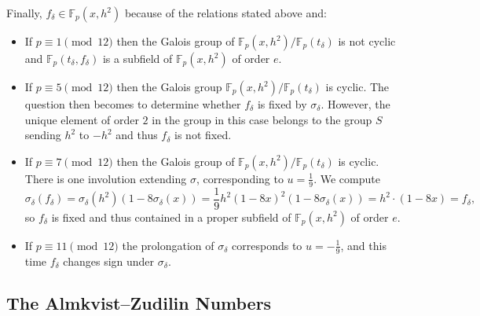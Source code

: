 \documentclass{article}
\newcommand{\F}{\mathbb{F}}
\theoremstyle{definition}
\theoremstyle{plain}
\theoremstyle{remark}
\begin{document}
Finally, $f_\delta \in \F_p(x, h^2)$ because of the relations stated above and:
\begin{itemize}
    \item If $p\equiv 1\pmod{12}$ then the Galois group of $\F_p(x, h^2)/\F_p(t_\delta)$ is not cyclic and $\F_p(t_\delta, f_\delta)$ is a subfield of $\F_p(x, h^2)$ of order $e$.
    \item If $p\equiv 5\pmod{12}$ then the Galois group $\F_p(x, h^2)/\F_p(t_\delta)$ is cyclic. The question then becomes to determine whether $f_\delta$ is fixed by $\sigma_\delta$. However, the unique element of order $2$ in the group in this case belongs to the group $S$ sending $h^2$ to $-h^2$ and thus $f_\delta$ is not fixed.
    \item If $p \equiv 7 \pmod{12}$ then the Galois group of $\F_p(x, h^2)/\F_p(t_\delta)$ is cyclic. There is one involution extending $\sigma$, corresponding to $u=\frac 1 9$. We compute
    \[\textstyle \sigma_\delta(f_\delta)= \sigma_\delta(h^2) (1-8\sigma_\delta(x)) = \frac 1 9 h^2 (1-8x)^2 (1-8\sigma_\delta(x)) = h^2\cdot (1-8x) = f_\delta,\]
    so $f_\delta$ is fixed and thus contained in a proper subfield of $\F_p(x, h^2)$ of order $e$.
    \item If $p \equiv 11 \pmod{12}$ the prolongation of $\sigma_\delta$ corresponds to $u=-\frac 1 9$, and this time $f_\delta$ changes sign under $\sigma_\delta$.
\end{itemize}

\subsection{The Almkvist--Zudilin Numbers}
\label{ssec:AZ}
\end{document}
